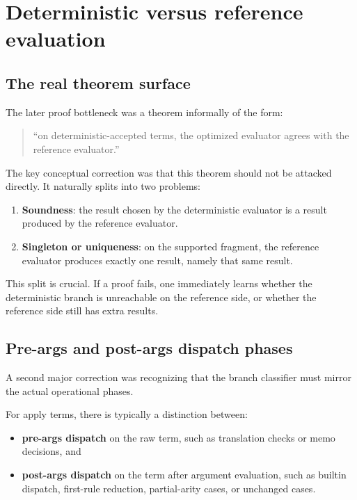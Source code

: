 \documentclass[11pt]{article}
\begin{document}
\section{Deterministic versus reference evaluation}

\subsection{The real theorem surface}

The later proof bottleneck was a theorem informally of the form:

\begin{quote}
``on deterministic-accepted terms, the optimized evaluator agrees with the reference evaluator.''
\end{quote}

The key conceptual correction was that this theorem should not be attacked directly. It naturally splits into two problems:

\begin{enumerate}
  \item \textbf{Soundness}: the result chosen by the deterministic evaluator is a result produced by the reference evaluator.
  \item \textbf{Singleton or uniqueness}: on the supported fragment, the reference evaluator produces exactly one result, namely that same result.
\end{enumerate}

This split is crucial. If a proof fails, one immediately learns whether the deterministic branch is unreachable on the reference side, or whether the reference side still has extra results.

\subsection{Pre-args and post-args dispatch phases}

A second major correction was recognizing that the branch classifier must mirror the actual operational phases.

For apply terms, there is typically a distinction between:

\begin{itemize}
  \item \textbf{pre-args dispatch} on the raw term, such as translation checks or memo decisions, and
  \item \textbf{post-args dispatch} on the term after argument evaluation, such as builtin dispatch, first-rule reduction, partial-arity cases, or unchanged cases.
\end{itemize}
\end{document}
